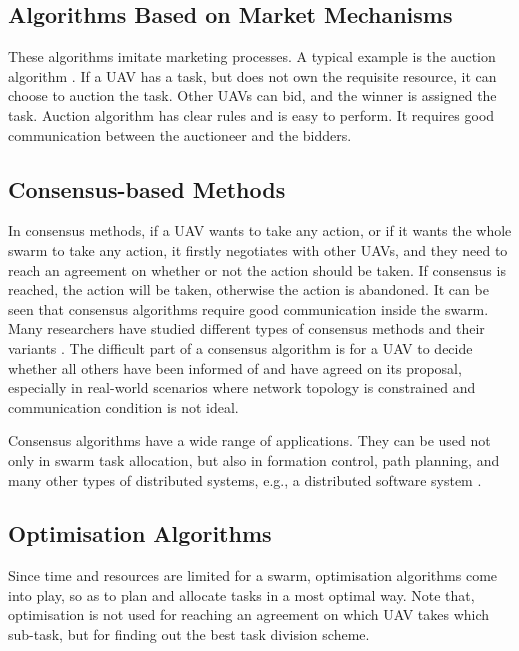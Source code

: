 \subsection{Algorithms Based on Market Mechanisms}

These algorithms imitate marketing processes.
A typical example is the auction algorithm \parencite{Peng2021, Kim2020, Sujit2007}.
If a UAV has a task, but does not own the requisite resource,
it can choose to auction the task.
Other UAVs can bid, and the winner is assigned the task.
Auction algorithm has clear rules and is easy to perform.
It requires good communication between the auctioneer and the bidders.

\subsection{Consensus-based Methods}

In consensus methods, if a UAV wants to take any action,
or if it wants the whole swarm to take any action,
it firstly negotiates with other UAVs,
and they need to reach an agreement on whether or not the action should be taken.
If consensus is reached, the action will be taken,
otherwise the action is abandoned.
It can be seen that consensus algorithms require good communication inside the swarm.
Many researchers have studied different types of consensus methods and
their variants \parencite{Pasek2022, Ranganathan2022, Grishchenko2021, Li2019}.
The difficult part of a consensus algorithm is for a UAV to decide
whether all others have been informed of and have agreed on its proposal,
especially in real-world scenarios where network topology is constrained
and communication condition is not ideal.

Consensus algorithms have a wide range of applications.
They can be used not only in swarm task allocation,
but also in formation control, path planning,
and many other types of distributed systems,
e.g., a distributed software system \parencite{Ongaro2014}.

\subsection{Optimisation Algorithms}

Since time and resources are limited for a swarm,
optimisation algorithms come into play,
so as to plan and allocate tasks in a most optimal way.
Note that, optimisation is not used for
reaching an agreement on which UAV takes which sub-task,
but for finding out the best task division scheme.

